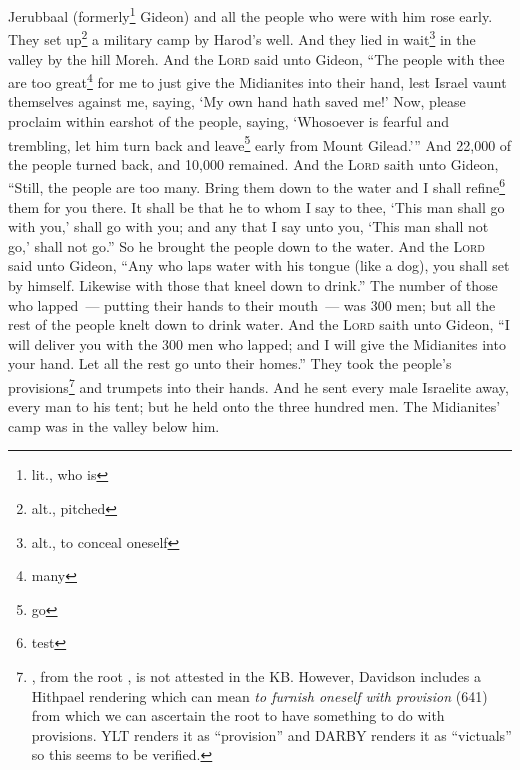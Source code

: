 
\begin{inparaenum}
     Jerubbaal (formerly\footnote{lit., who is} Gideon) and all the people who were with him rose early. They set up\footnote{alt., pitched} a military camp by Harod's well. And they lied in wait\footnote{alt., to conceal oneself} in the valley by the hill Moreh.%
     And the \textsc{Lord} said unto Gideon, ``The people with thee are too great\footnote{many} for me to just give the Midianites into their hand, lest Israel vaunt themselves against me, saying, `My own hand hath saved me!'%
     Now, please proclaim within earshot of the people, saying, `Whosoever is fearful and trembling, let him turn back and leave\footnote{go} early from Mount Gilead.'\thinspace'' And 22,000 of the people turned back, and 10,000 remained.%
     And the \textsc{Lord} saith unto Gideon, ``Still, the people are too many. Bring them down to the water and I shall refine\footnote{test} them for you there. It shall be that he to whom I say to thee, `This man shall go with you,' shall go with you; and any that I say unto you, `This man shall not go,' shall not go.''%
     So he brought the people down to the water. And the \textsc{Lord} said unto Gideon, ``Any who laps water with his tongue (like a dog), you shall set by himself. Likewise with those that kneel down to drink.''%
     The number of those who lapped~--- putting their hands to their mouth~--- was 300 men; but all the rest of the people knelt down to drink water.%
     And the \textsc{Lord} saith unto Gideon, ``I will deliver you with the 300 men who lapped; and I will give the Midianites into your hand. Let all the rest go unto their homes.''%
     They took the people's provisions\footnote{, from the root , is not attested in the KB. However, Davidson includes a Hithpael rendering which can mean \textit{to furnish oneself with provision} (641) from which we can ascertain the root to have something to do with provisions. YLT renders it as ``provision'' and DARBY renders it as ``victuals'' so this seems to be verified.} and trumpets into their hands. And he sent every male Israelite away, every man to his tent; but he held onto the three hundred men. The Midianites' camp was in the valley below him.%

\end{inparaenum}
